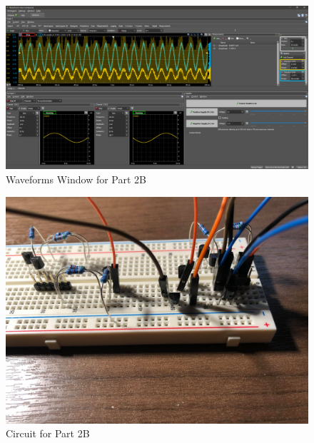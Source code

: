 \documentclass[12pt]{article}
\begin{document}
\begin{figure}[!ht]
    \centering
    \includegraphics[width=\textwidth]{part2waves}
    \caption{\label{fig:waves}Waveforms Window for Part 2B}
\end{figure}
\begin{figure}[!ht]
    \centering
    \includegraphics[width=\textwidth]{circuit}
    \caption{\label{fig:circuit}Circuit for Part 2B}
\end{figure}
\end{document}
